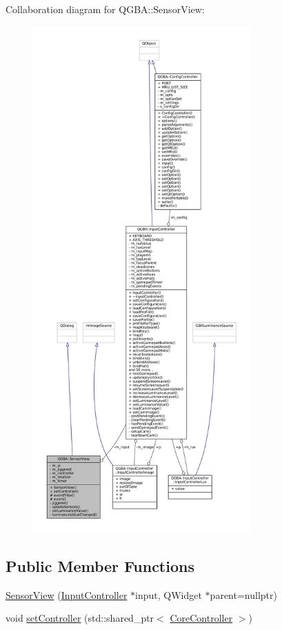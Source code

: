 Collaboration diagram for Q\+G\+BA\+:\+:Sensor\+View\+:
\nopagebreak
\begin{figure}[H]
\begin{center}
\leavevmode
\includegraphics[height=550pt]{class_q_g_b_a_1_1_sensor_view__coll__graph}
\end{center}
\end{figure}
\subsection*{Public Member Functions}
\begin{DoxyCompactItemize}
\item 
\mbox{\hyperlink{class_q_g_b_a_1_1_sensor_view_a35d0e03e33ccb200c6c20c22db1950cd}{Sensor\+View}} (\mbox{\hyperlink{class_q_g_b_a_1_1_input_controller}{Input\+Controller}} $\ast$input, Q\+Widget $\ast$parent=nullptr)
\item 
void \mbox{\hyperlink{class_q_g_b_a_1_1_sensor_view_aef94bd97606a185f823636106bd0b2ca}{set\+Controller}} (std\+::shared\+\_\+ptr$<$ \mbox{\hyperlink{class_q_g_b_a_1_1_core_controller}{Core\+Controller}} $>$)
\end{DoxyCompactItemize}
